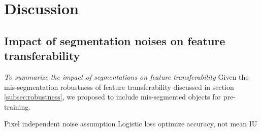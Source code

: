 \section{Discussion}
\label{sec:results}

\subsection{Impact of segmentation noises on feature transferability}
\noindent \textit{To summarize the impact of segmentations on feature transferability}
Given the mis-segmentation robustness of feature transferability discussed in section \ref{subsec:robustness}, we proposed to include mis-segmented objects for pre-training.


Pixel independent noise assumption
Logistic loss optimize accuracy, not mean IU
